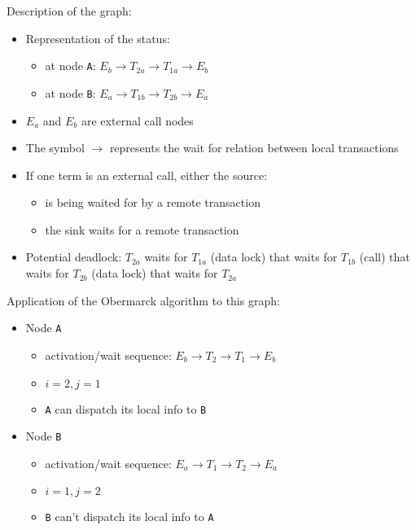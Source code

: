 \documentclass[english]{article}
\begin{document}
Description of the graph:
\begin{itemize}
  \item Representation of the status:
        \begin{itemize}
          \item at node \texttt{A}: \(E_b \rightarrow T_{2a} \rightarrow T_{1a} \rightarrow E_b\)
          \item at node \texttt{B}: \(E_a \rightarrow T_{1b} \rightarrow T_{2b} \rightarrow E_a\)
        \end{itemize}
  \item \(E_a\) and \(E_b\) are external call nodes
  \item The symbol \(\rightarrow\) represents the wait for relation between local transactions
  \item If one term is an external call, either the source:
        \begin{itemize}
          \item is being waited for by a remote transaction
          \item the sink waits for a remote transaction
        \end{itemize}
  \item Potential deadlock: \(T_{2a}\) waits for \(T_{1a}\) (data lock) that waits for \(T_{1b}\) (call) that waits for \(T_{2b}\) (data lock) that waits for \(T_{2a}\)
\end{itemize}

Application of the Obermarck algorithm to this graph:
\begin{itemize}
  \item Node \texttt{A}
        \begin{itemize}
          \item activation/wait sequence: \(E_b \rightarrow T_{2} \rightarrow T_{1} \rightarrow E_b\)
          \item \(i = 2, j = 1\)
          \item \texttt{A} can dispatch its local info to \texttt{B}
        \end{itemize}
  \item Node \texttt{B}
        \begin{itemize}
          \item activation/wait sequence: \(E_a \rightarrow T_{1} \rightarrow T_{2} \rightarrow E_a\)
          \item \(i = 1, j = 2\)
          \item \texttt{B} can't dispatch its local info to \texttt{A}
        \end{itemize}
\end{itemize}
\end{document}
